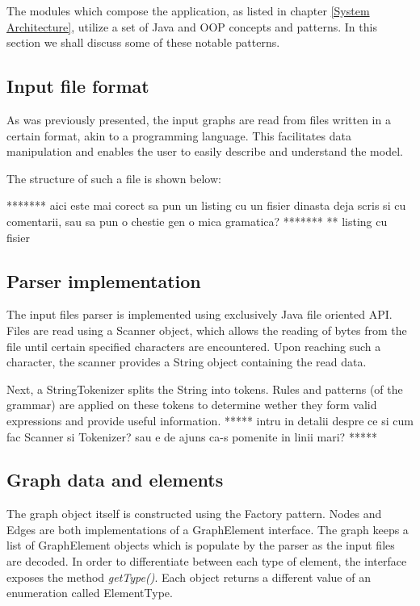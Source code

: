 The modules which compose the application, as listed in chapter \ref{System Architecture}, utilize a set of Java 
and OOP concepts and patterns. In this section we shall discuss some of these notable patterns.

\subsection{Input file format}

As was previously presented, the input graphs are read from files written in a certain format, akin to a programming 
language. This facilitates data manipulation and enables the user to easily describe and understand the model. 

The structure of such a file is shown below:

******* aici este mai corect sa pun un listing cu un fisier dinasta deja scris si cu comentarii, sau sa pun o chestie gen o mica gramatica? *******
** listing cu fisier

\subsection{Parser implementation}

The input files parser is implemented using exclusively Java file oriented API. Files are read using a Scanner object, 
which allows the reading of bytes from the file until certain specified characters are encountered. Upon reaching 
such a character, the scanner provides a String object containing the read data. 

Next, a StringTokenizer splits the String into tokens. Rules and patterns (of the grammar) are applied on these tokens 
to determine wether they form valid expressions and provide useful information. ***** intru in detalii despre ce si cum 
fac Scanner si Tokenizer? sau e de ajuns ca-s pomenite in linii mari? *****

\subsection{Graph data and elements}

The graph object itself is constructed using the Factory pattern. Nodes and Edges are both implementations of a 
GraphElement interface. The graph keeps a list of GraphElement objects which is populate by the parser as the input 
files are decoded. In order to differentiate between each type of element, the interface exposes the method 
\emph{getType()}. Each object returns a different value of an enumeration called ElementType. 

